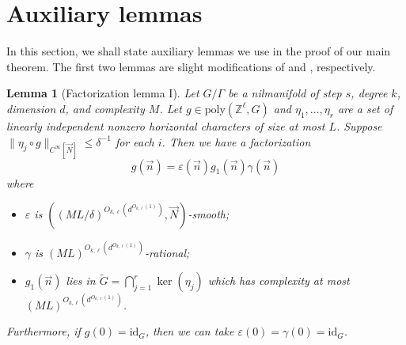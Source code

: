 \documentclass[11pt, a4paper]{amsart}
\theoremstyle{plain}
\theoremstyle{plain}
\newtheorem{lemma}{Lemma}
\theoremstyle{definition}
\theoremstyle{remark}
\numberwithin{equation}{section}
\numberwithin{lemma}{section}
\numberwithin{proposition}{section}
\numberwithin{corollary}{section}
\numberwithin{definition}{section}
\numberwithin{claim}{section}
\begin{document}
\section{Auxiliary lemmas}\label{s:aux}
In this section, we shall state auxiliary lemmas we use in the proof of our main theorem. The first two lemmas are slight modifications of \cite[Proposition 9.2]{GT12} and \cite[Lemma 7.9]{GT12}, respectively.
\begin{lemma}[Factorization lemma I]\label{l:factorization1}
Let $G/\Gamma$ be a nilmanifold of step $s$, degree $k$, dimension $d$, and complexity $M$. Let $g \in \mathrm{poly}(\mathbb{Z}^\ell, G)$ and $\eta_1, \dots, \eta_r$ are a set of linearly independent nonzero horizontal characters of size at most $L$. Suppose $\|\eta_j \circ g\|_{C^\infty[\vec{N}]} \le \delta^{-1}$ for each $i$. Then we have a factorization
$$g(\vec{n}) = \varepsilon(\vec{n})g_1(\vec{n})\gamma(\vec{n})$$
where
\begin{itemize}
    \item $\varepsilon$ is $((ML/\delta)^{O_{k, \ell}(d^{O_{k, \ell}(1)})}, \vec{N})$-smooth;
    \item $\gamma$ is $(ML)^{O_{k, \ell}(d^{O_{k, \ell}(1)})}$-rational;
    \item $g_1(\vec{n})$ lies in $\tilde{G} = \bigcap_{j = 1}^r \operatorname{ker}(\eta_j)$
which has complexity at most $(ML)^{O_{k, \ell}(d^{O_{k, \ell}(1)})}$.
\end{itemize} 
Furthermore, if $g(0) = \mathrm{id}_G$, then we can take $\varepsilon(0) = \gamma(0) = \mathrm{id}_G$.
\end{lemma}
\end{document}
